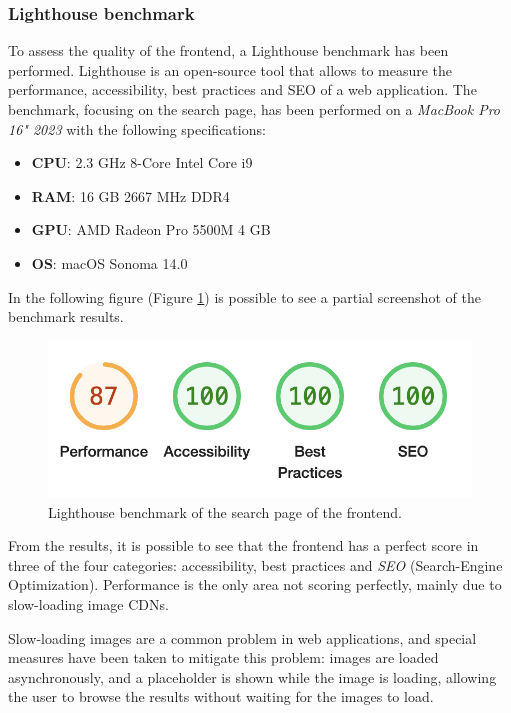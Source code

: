 \subsubsection{Lighthouse benchmark}
\label{sec:lighthouse-benchmark}

To assess the quality of the frontend, a Lighthouse benchmark has been performed. Lighthouse is an open-source tool that allows to measure the performance, accessibility, best practices and SEO of a web application. The benchmark, focusing on the search page, has been performed on a \textit{MacBook Pro 16" 2023} with the following specifications:

\begin{itemize}
  \item \textbf{CPU}: 2.3 GHz 8-Core Intel Core i9
  \item \textbf{RAM}: 16 GB 2667 MHz DDR4
  \item \textbf{GPU}: AMD Radeon Pro 5500M 4 GB
  \item \textbf{OS}: macOS Sonoma 14.0
\end{itemize}

In the following figure (Figure \ref{fig:lighthouse-benchmark}) is possible to see a partial screenshot of the benchmark results.

\begin{figure}[H]
  \centering
  \includegraphics[width=.5\textwidth]{img/3_implementation/lighthouse-benchmark.png}
  \caption{Lighthouse benchmark of the search page of the frontend.}
  \label{fig:lighthouse-benchmark}
\end{figure}

From the results, it is possible to see that the frontend has a perfect score in three of the four categories: accessibility, best practices and \textit{SEO} (Search-Engine Optimization). Performance is the only area not scoring perfectly, mainly due to slow-loading image CDNs.

Slow-loading images are a common problem in web applications, and special measures have been taken to mitigate this problem: images are loaded asynchronously, and a placeholder is shown while the image is loading, allowing the user to browse the results without waiting for the images to load.

